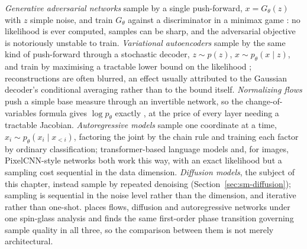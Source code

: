 \emph{Generative adversarial networks} sample by a single push-forward,
$x = G_\theta(z)$ with $z$ simple noise, and train $G_\theta$ against a
discriminator in a minimax game \citep{goodfellow2014generative}: no
likelihood is ever computed, samples can be sharp, and the adversarial
objective is notoriously unstable to train. \emph{Variational autoencoders}
sample by the same kind of push-forward through a stochastic decoder,
$z \sim p(z)$, $x \sim p_\theta(x \mid z)$, and train by maximising a
tractable lower bound on the likelihood \citep{kingma2014auto};
reconstructions are often blurred, an effect usually attributed to the
Gaussian decoder's conditional averaging rather than to the bound itself.
\emph{Normalizing flows} push a simple base measure through an invertible
network, so the change-of-variables formula gives $\log p_\theta$ exactly
\citep{rezende2015variational, papamakarios2021normalizing}, at the price of
every layer needing a tractable Jacobian. \emph{Autoregressive models} sample
one coordinate at a time, $x_i \sim p_\theta(x_i \mid x_{<i})$, factoring the
joint by the chain rule and training each factor by ordinary classification;
transformer-based language models \citep{vaswani2017attention} and, for
images, PixelCNN-style networks \citep{vandenoord2016pixel} both work this
way, with an exact likelihood but a sampling cost sequential in the data
dimension. \emph{Diffusion models}, the subject of this chapter, instead
sample by repeated denoising (Section~\ref{sec:sm-diffusion}); sampling is
sequential in the noise level rather than the dimension, and iterative rather
than one-shot. \citet{ghio2024sampling} places flows, diffusion and
autoregressive networks under one spin-glass analysis and finds the same
first-order phase transition governing sample quality in all three, so the
comparison between them is not merely architectural.